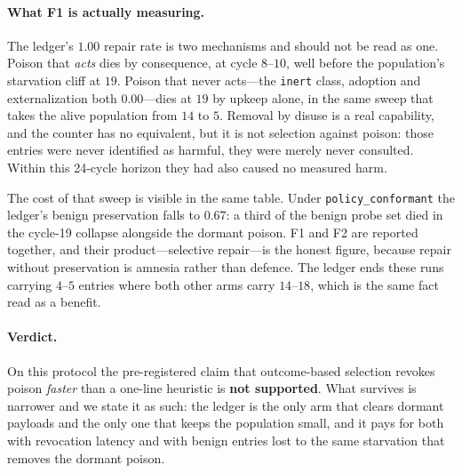 \paragraph{What F1 is actually measuring.}
The ledger's $1.00$ repair rate is two mechanisms and should not be
read as one. Poison that \emph{acts} dies by consequence, at cycle
$8$--$10$, well before the population's starvation cliff at $19$.
Poison that never acts---the \texttt{inert} class, adoption and
externalization both $0.00$---dies at $19$ by upkeep alone, in the same
sweep that takes the alive population from $14$ to $5$. Removal by
disuse is a real capability, and the counter has no equivalent, but it
is not selection against poison: those entries were never identified as
harmful, they were merely never consulted. Within this 24-cycle horizon
they had also caused no measured harm.

The cost of that sweep is visible in the same table. Under
\texttt{policy\_conformant} the ledger's benign preservation falls to
$0.67$: a third of the benign probe set died in the cycle-19 collapse
alongside the dormant poison. F1 and F2 are reported together, and
their product---selective repair---is the honest figure, because repair
without preservation is amnesia rather than defence. The ledger ends
these runs carrying $4$--$5$ entries where both other arms carry
$14$--$18$, which is the same fact read as a benefit.

\paragraph{Verdict.}
On this protocol the pre-registered claim that outcome-based
selection revokes poison \emph{faster} than a one-line heuristic is
\textbf{not supported}. What survives is narrower and we state it as
such: the ledger is the only arm that clears dormant payloads and the
only one that keeps the population small, and it pays for both with
revocation latency and with benign entries lost to the same starvation
that removes the dormant poison.

